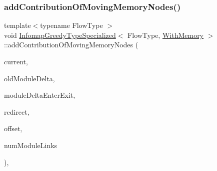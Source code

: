 \subsubsection{\texorpdfstring{add\+Contribution\+Of\+Moving\+Memory\+Nodes()}{addContributionOfMovingMemoryNodes()}\hspace{0.1cm}{\footnotesize\ttfamily [1/2]}}
{\footnotesize\ttfamily template$<$typename Flow\+Type $>$ \\
void \mbox{\hyperlink{classInfomapGreedyTypeSpecialized}{Infomap\+Greedy\+Type\+Specialized}}$<$ Flow\+Type, \mbox{\hyperlink{structWithMemory}{With\+Memory}} $>$\+::add\+Contribution\+Of\+Moving\+Memory\+Nodes (\begin{DoxyParamCaption}\item[{\mbox{\hyperlink{classMemNode}{Node\+Type}} \&}]{current,  }\item[{\mbox{\hyperlink{structMemDeltaFlow}{Delta\+Flow\+Type}} \&}]{old\+Module\+Delta,  }\item[{std\+::vector$<$ \mbox{\hyperlink{structMemDeltaFlow}{Delta\+Flow\+Type}} $>$ \&}]{module\+Delta\+Enter\+Exit,  }\item[{std\+::vector$<$ unsigned int $>$ \&}]{redirect,  }\item[{unsigned int \&}]{offset,  }\item[{unsigned int \&}]{num\+Module\+Links }\end{DoxyParamCaption})\hspace{0.3cm}{\ttfamily [inline]}, {\ttfamily [protected]}}

